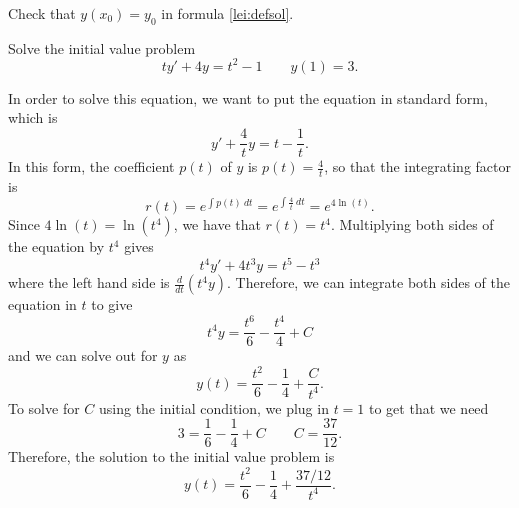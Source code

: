 \begin{exercise}
Check that $y(x_0) = y_0$ in formula \eqref{lei:defsol}.
\end{exercise}

\begin{example}
Solve the initial value problem
\begin{equation*}
ty' + 4y = t^2 - 1 \qquad y(1) = 3.
\end{equation*}
\end{example}
\begin{exampleSol}
In order to solve this equation, we want to put the equation in standard form, which is
\begin{equation*}
y' + \frac{4}{t}y = t - \frac{1}{t}.
\end{equation*}
In this form, the coefficient $p(t)$ of $y$ is $p(t) = \frac{4}{t}$, so that the integrating factor is 
\[ r(t) = e^{\int p(t)\ dt} = e^{\int \frac{4}{t}\ dt} = e^{4\ln(t)}. \] Since $4\ln(t) = \ln(t^4)$, we have that $r(t) = t^4$. Multiplying both sides of the equation by $t^4$ gives
\begin{equation*}
t^4y' + 4t^3 y = t^5 - t^3
\end{equation*}
where the left hand side is $\frac{d}{dt}(t^4y)$. Therefore, we can integrate both sides of the equation in $t$ to give
\begin{equation*}
t^4 y = \frac{t^6}{6} - \frac{t^4}{4} + C
\end{equation*}
and we can solve out for $y$ as
\begin{equation*}
y(t) = \frac{t^2}{6} - \frac{1}{4} + \frac{C}{t^4}.
\end{equation*}
To solve for $C$ using the initial condition, we plug in $t=1$ to get that we need
\begin{equation*}
3 = \frac{1}{6} - \frac{1}{4} + C \qquad C = \frac{37}{12}.
\end{equation*}
Therefore, the solution to the initial value problem is
\begin{equation*}
y(t) = \frac{t^2}{6} - \frac{1}{4} + \frac{37/12}{t^4}.
\end{equation*}
\end{exampleSol}

